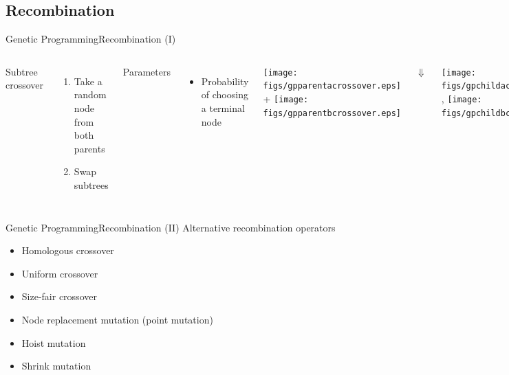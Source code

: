 \documentclass[10pt,compress]{beamer} %
\begin{document}
\subsection{Recombination}

\begin{frame}[fragile]{Genetic Programming}{Recombination (I)}
    \begin{columns}
			Subtree crossover
			\begin{enumerate}
				\item Take a random node from both parents
				\item Swap subtrees
			\end{enumerate}
			Parameters
			\begin{itemize}
				\item Probability of choosing a terminal node
			\end{itemize}

    		\begin{columns}
					\texttt{[image: figs/gpparentacrossover.eps]} 
					+
					\texttt{[image: figs/gpparentbcrossover.eps]}
			\end{columns}

			\begin{center}
				$\Downarrow$
			\end{center}

			\begin{columns}
 	   			\column{.5\textwidth}
					\texttt{[image: figs/gpchildacrossover.eps]} 
 	   			\column{.02\textwidth}
					,
 	   			\column{.5\textwidth}
					\texttt{[image: figs/gpchildbcrossover.eps]}
			\end{columns}

	\end{columns}
\end{frame}

\begin{frame}{Genetic Programming}{Recombination (II)} 
	Alternative recombination operators
	\begin{itemize}
		\item Homologous crossover
		\item Uniform crossover
		\item Size-fair crossover
		\item Node replacement mutation (point mutation)
		\item Hoist mutation
		\item Shrink mutation
	\end{itemize}
\end{frame}
\end{document}
